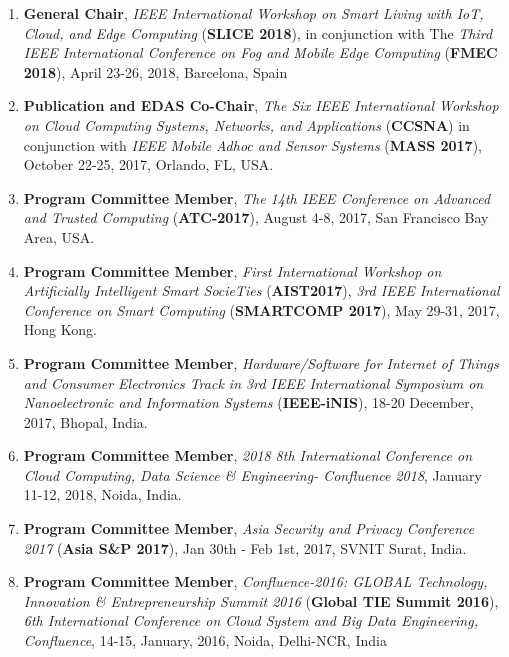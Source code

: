 
\begin{enumerate}

\item
\textbf{General Chair}, \textit{IEEE International Workshop on Smart Living with IoT, Cloud, and Edge Computing }(\textbf{SLICE 2018}), in conjunction with The \textit{Third IEEE International Conference on Fog and Mobile Edge Computing} (\textbf{FMEC 2018}), April 23-26, 2018, Barcelona, Spain

\item
\textbf{Publication and EDAS Co-Chair}, \textit{The Six IEEE International Workshop on Cloud Computing Systems, Networks, and Applications }(\textbf{CCSNA}) in conjunction with \textit{IEEE Mobile Adhoc and Sensor Systems} (\textbf{MASS 2017}), October 22-25, 2017, Orlando, FL, USA.

\item
\textbf{Program Committee Member}, \textit{The 14th IEEE Conference on Advanced and Trusted Computing} (\textbf{ATC-2017}), August 4-8, 2017, San Francisco Bay Area, USA.

\item
\textbf{Program Committee Member}, \textit{First International Workshop on Artificially Intelligent Smart SocieTies} (\textbf{AIST2017}), \textit{3rd IEEE International Conference on Smart Computing} (\textbf{SMARTCOMP 2017}), May 29-31, 2017, Hong Kong.

\item
\textbf{Program Committee Member},\textit{ Hardware/Software for Internet of Things and Consumer Electronics Track in 3rd IEEE International Symposium on Nanoelectronic and Information Systems} (\textbf{IEEE-iNIS}), 18-20 December, 2017, Bhopal, India.

\item
\textbf{Program Committee Member}, \textit{2018 8th International Conference on Cloud Computing, Data Science \& Engineering- Confluence 2018}, January 11-12, 2018, Noida, India.

\item
\textbf{Program Committee Member}, \textit{Asia Security and Privacy Conference 2017} (\textbf{Asia S\&P 2017}), Jan 30th - Feb 1st, 2017, SVNIT Surat, India.

\item
\textbf{Program Committee Member},  \textit{Confluence-2016: GLOBAL Technology, Innovation \& Entrepreneurship Summit 2016 }(\textbf{Global TIE Summit 2016}),\textit{ 6th International Conference on Cloud System and Big Data Engineering, Confluence}, 14-15, January, 2016, Noida, Delhi-NCR, India


\end{enumerate}
